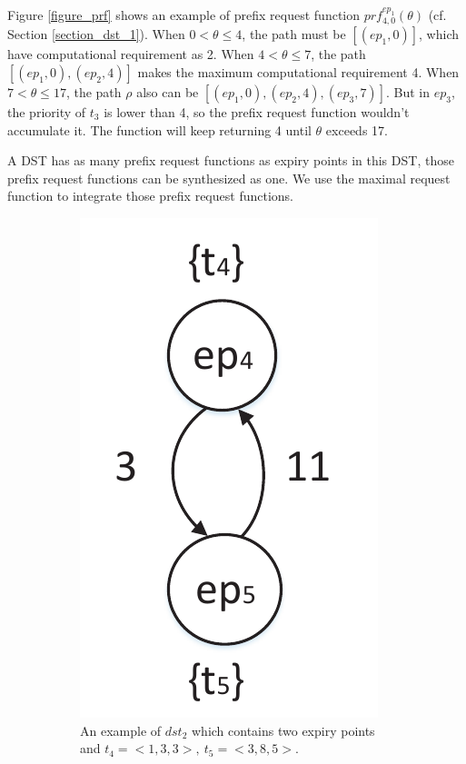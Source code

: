 \documentclass[10pt,conference]{IEEEtran}
\begin{document}
Figure \ref{figure_prf} shows an example of prefix request function $prf^{ep_1}_{4,0}(\theta)$ (cf. Section \ref{section_dst_1}). When $0<\theta\leq4$, the path must be $[(ep_1,0)]$, which have computational requirement as 2. When $4<\theta\leq7$, the path $[(ep_1,0),(ep_2,4)]$ makes the maximum computational requirement 4. When $7<\theta\leq17$, the path $\rho$ also can be $[(ep_1,0),(ep_2,4),(ep_3,7)]$. But in $ep_3$, the priority of $t_3$ is lower than 4, so the prefix request function wouldn't accumulate it. The function will keep returning 4 until $\theta$ exceeds 17.

A DST has as many prefix request functions as expiry points in this DST, those prefix request functions can be synthesized as one. We use the maximal request function to integrate those prefix request functions.
\begin{figure}
  \centering
  \begin{subfigure}[t]{3.25in}
    \centering
    \includegraphics[scale=.5]{graphics/figure_dst2-eps-converted-to.pdf}
    \caption{An example of $dst_2$ which contains two expiry points and $t_4=<1,3,3>,\ t_5=<3,8,5>$.}\label{figure_dst2}
  \end{subfigure}
  \quad
  \begin{subfigure}[t]{3.25in}

\end{subfigure}
\end{figure}
\end{document}
